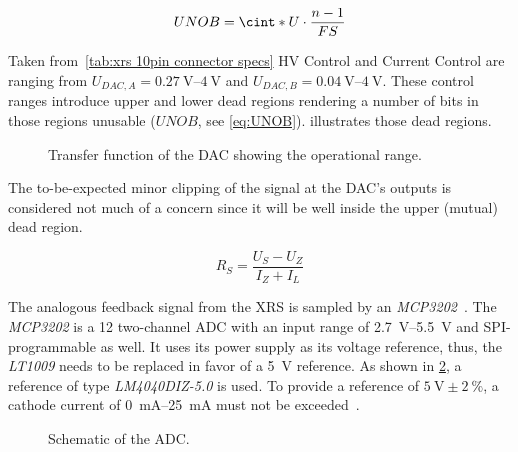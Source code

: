             \begin{align}
                UNOB = \cint*{ U \cdot \frac{n - 1}{FS}}
                \label{eq:UNOB}
            \end{align}

            Taken from~\cref{tab:xrs 10pin connector specs} HV Control and Current Control are ranging from \(U_{DAC,A} = \qtyrange{0.27}{4}{\volt}\) and \(U_{DAC,B} = \qtyrange{0.04}{4}{\volt}\).
            These control ranges introduce upper and lower dead regions rendering a number of bits in those regions unusable (\(UNOB\), see \cref{eq:UNOB}).
             illustrates those dead regions.

            \begin{figure}[h]
                \centering
                
                \caption[Transfer function of the DAC showing the operational range]{Transfer function of the DAC showing the operational range.}%
                \label{fig:transfer function DAC}
            \end{figure}

            The to-be-expected minor clipping of the signal at the DAC's outputs is considered not much of a concern since it will be well inside the upper (mutual) dead region.

            \begin{equation}
                R_S = \frac{U_S - U_Z}{I_Z + I_L}
                \label{eq:LM4040 cathode current}
            \end{equation}

            The analogous feedback signal from the XRS is sampled by an \textit{MCP3202}~\cite{Manual.ADC.MCP3202}.
            The \textit{MCP3202} is a \qty{12}{\bit} two-channel ADC with an input range of \qtyrange{2.7}{5.5}{\volt} and SPI-programmable as well.
            It uses its power supply as its voltage reference, thus, the \textit{LT1009} needs to be replaced in favor of a \qty{5}{\volt} reference.
            As shown in \cref{fig:ADC schematic}, a reference of type \textit{LM4040DIZ-5.0} is used.
            To provide a reference of \(\qty{5}{\volt} \pm \qty{2}{\percent}\), a cathode current of \qtyrange{0}{25}{\milli\ampere} must not be exceeded~\cite{Manual.LM4040PrecisionMicropowerShuntVoltageReference}.

            \begin{figure}[h]
                \centering
                
                \caption[Schematic of the ADC]{Schematic of the ADC.}%
                \label{fig:ADC schematic}
            \end{figure}

